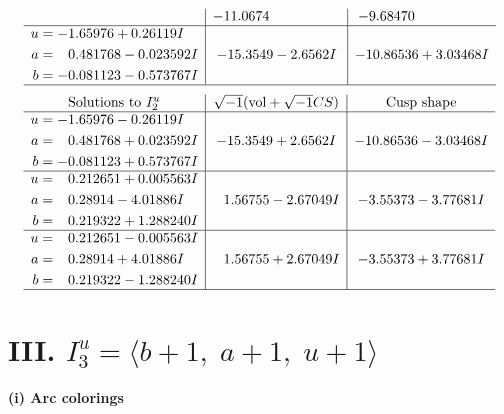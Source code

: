 \documentclass[1p]{elsarticle_modified}
\theoremstyle{definition}
\newcommand{\I}{\sqrt{-1}}
\begin{document}
$$\begin{array}{c|c|c}
 & -11.0674\phantom{ +0.000000I} & -9.68470\phantom{ +0.000000I} \\ \hline\begin{aligned}
u &= -1.65976 + 0.26119 I \\
a &= \phantom{-}0.481768 - 0.023592 I \\
b &= -0.081123 - 0.573767 I\end{aligned}
 & -15.3549 - 2.6562 I & -10.86536 + 3.03468 I\\
 \hline 
 \end{array}$$\newpage$$\begin{array}{c|c|c}  
\text{Solutions to }I^u_{2}& \I (\text{vol} + \sqrt{-1}CS) & \text{Cusp shape}\\
 \hline 
\begin{aligned}
u &= -1.65976 - 0.26119 I \\
a &= \phantom{-}0.481768 + 0.023592 I \\
b &= -0.081123 + 0.573767 I\end{aligned}
 & -15.3549 + 2.6562 I & -10.86536 - 3.03468 I \\ \hline\begin{aligned}
u &= \phantom{-}0.212651 + 0.005563 I \\
a &= \phantom{-}0.28914 - 4.01886 I \\
b &= \phantom{-}0.219322 + 1.288240 I\end{aligned}
 & \phantom{-}1.56755 - 2.67049 I & -3.55373 - 3.77681 I \\ \hline\begin{aligned}
u &= \phantom{-}0.212651 - 0.005563 I \\
a &= \phantom{-}0.28914 + 4.01886 I \\
b &= \phantom{-}0.219322 - 1.288240 I\end{aligned}
 & \phantom{-}1.56755 + 2.67049 I & -3.55373 + 3.77681 I\\
 \hline 
 \end{array}$$\newpage\newpage\renewcommand{\arraystretch}{1}
\centering \section*{III. $I^u_{3}= \langle b+1,\;a+1,\;u+1 \rangle$}
\flushleft \textbf{(i) Arc colorings}\\
\end{document}
